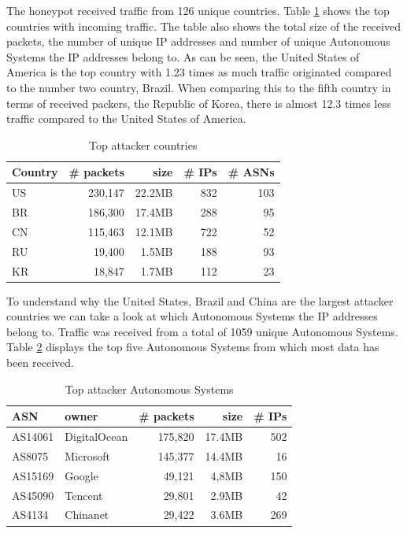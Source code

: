 The honeypot received traffic from 126 unique countries. Table \ref{table:ip_locations} shows the top countries with incoming traffic. The table also shows the total size of the received packets, the number of unique IP addresses and number of unique Autonomous Systems the IP addresses belong to. As can be seen, the United States of America is the top country with 1.23 times as much traffic originated compared to the number two country, Brazil. When comparing this to the fifth country in terms of received packers, the Republic of Korea, there is almost 12.3 times less traffic compared to the United States of America.

\begin{table}[h]
\centering
\begin{tabular}{ |l|r|r|r|r| } 
\hline
Country & \# packets & size & \# IPs & \# ASNs \\ \hline
US & 230,147 & 22.2MB & 832 & 103 \\ \hline
BR & 186,300 & 17.4MB & 288 & 95 \\ \hline
CN & 115,463 & 12.1MB & 722 & 52 \\ \hline
RU & 19,400 & 1.5MB & 188 & 93 \\ \hline
KR & 18,847 & 1.7MB & 112 & 23 \\ \hline
\end{tabular}
\caption{Top attacker countries}
\label{table:ip_locations}
\end{table}

To understand why the United States, Brazil and China are the largest attacker countries we can take a look at which Autonomous Systems the IP addresses belong to. Traffic was received from a total of 1059 unique Autonomous Systems. Table \ref{table:asn_attacks} displays the top five Autonomous Systems from which most data has been received.

\begin{table}[h]
\centering
\begin{tabular}{ |l|l|r|r|r| } 
\hline
ASN & owner & \# packets & size & \# IPs \\ \hline
AS14061 & DigitalOcean & 175,820 & 17.4MB & 502 \\ \hline
AS8075 & Microsoft & 145,377 & 14.4MB & 16 \\ \hline
AS15169 & Google & 49,121 & 4,8MB & 150 \\ \hline
AS45090 & Tencent & 29,801 & 2.9MB & 42 \\ \hline
AS4134 & Chinanet & 29,422 & 3.6MB & 269 \\ \hline
\end{tabular}
\caption{Top attacker Autonomous Systems}
\label{table:asn_attacks}
\end{table}

